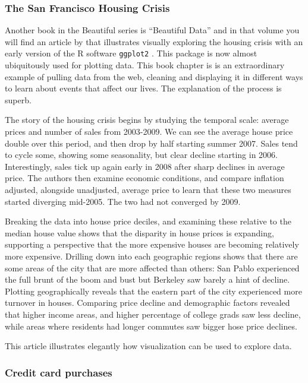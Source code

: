 \documentclass{article}
\begin{document}
\subsubsection{The San Francisco Housing Crisis}

Another book in the Beautiful series is ``Beautiful Data'' and in that volume you will find an article by \citet{SFHousing} that illustrates visually exploring the housing crisis with an early version of the R software {\tt ggplot2} \citep{wickham2009ggplot2}. This package is now almost ubiquitously used for plotting data. This book chapter is is an extraordinary example of pulling data from the web, cleaning and displaying it in different ways to learn about events that affect our lives. The explanation of the process is superb.

The story of the housing crisis begins by studying the temporal scale: average prices and number of sales from 2003-2009. We can see the average house price double over this period, and then drop by half starting summer 2007. Sales tend to cycle some, showing some seasonality, but clear decline starting in 2006. Interestingly, sales tick up again early in 2008 after sharp declines in average price. The authors then examine economic conditions, and compare inflation adjusted,  alongside unadjusted, average price to learn that these two measures started diverging mid-2005. The two had not converged by 2009.

Breaking the data into house price deciles, and examining these relative to the median house value shows that the disparity in house prices is expanding, supporting a perspective that the more expensive houses are becoming relatively more expensive. Drilling down into each geographic regions shows that there are some areas of the city that are more affected than others: San Pablo experienced the full brunt of the boom and bust but Berkeley saw barely a hint of decline. Plotting  geographically  reveals that the eastern part of the city experienced more turnover in houses. Comparing price decline and demographic factors revealed that higher income areas, and higher percentage of college grads saw less decline, while areas where residents had longer commutes saw bigger hose price declines.

This article illustrates elegantly how visualization can be used to explore data.

\subsubsection{Credit card purchases}
\end{document}
